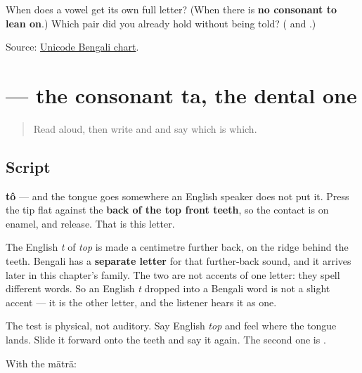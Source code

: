 \begin{tcolorbox}[breakable,colback=teal!4,colframe=teal!35!black,title={Before you move on}]
When does a vowel get its own full letter? (When there is \textbf{no consonant to lean on}.) Which pair did you already hold without being told? (\textbf{} and \textbf{}.)

Source: \href{https://www.unicode.org/charts/PDF/U0980.pdf}{Unicode Bengali chart}.
\end{tcolorbox}
\section[\texorpdfstring{\bn{ত} (tô)}{ত (tô)}]{ — the consonant ta, the dental one}

\label{lesson:BN-W02-ta}



\begin{quote}
Read \textbf{} aloud, then write \textbf{} and \textbf{} and say which is which.
\end{quote}

\subsection*{Script}

\begin{quote}
\end{quote}

\textbf{tô} — and the tongue goes somewhere an English speaker does not put it. Press the tip flat against the \textbf{back of the top front teeth}, so the contact is on enamel, and release. That is this letter.

The English \emph{t} of \emph{top} is made a centimetre further back, on the ridge behind the teeth. Bengali has a \textbf{separate letter} for that further-back sound, and it arrives later in this chapter's family. The two are not accents of one letter: they spell different words. So an English \emph{t} dropped into a Bengali word is not a slight accent — it is the other letter, and the listener hears it as one.

The test is physical, not auditory. Say English \emph{top} and feel where the tongue lands. Slide it forward onto the teeth and say it again. The second one is \textbf{}.

With the mātrā:

